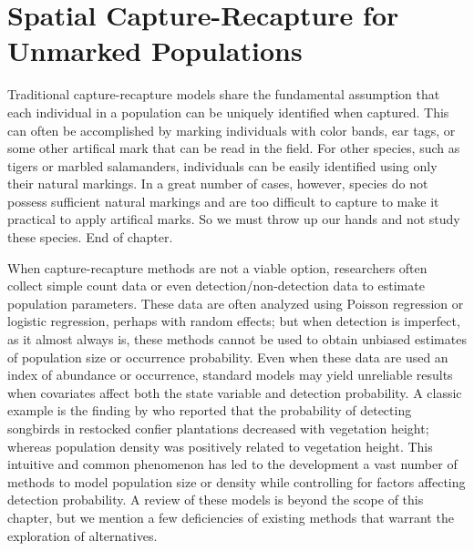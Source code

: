 


\chapter{Spatial Capture-Recapture for Unmarked Populations}
\label{chapt.scr-unmarked}

\vspace{0.3cm}


Traditional capture-recapture models share the fundamental
assumption that each individual in a population can be uniquely
identified when captured. This can often be accomplished
by marking individuals with color bands, ear tags, or some other
artifical mark that can be read in the field. For other species, such as
tigers or marbled salamanders, individuals can be easily identified
using only their natural markings. In a great number of cases, however,
species do not possess sufficient natural markings and are too
difficult to capture to make it practical to apply artifical marks. So
we must throw up our hands and not study these species. End of
chapter.

When capture-recapture methods are not a viable option, researchers
often collect simple count data or even detection/non-detection data
to estimate population parameters. These data are often analyzed using
Poisson regression or logistic regression, perhaps with random
effects; but when detection is imperfect, as it almost always is,
these methods cannot be used to obtain unbiased estimates of
population size or occurrence probability. Even when these data are
used an index of abundance or occurrence, standard models may yield
unreliable results when covariates affect both the state variable and
detection probability. A classic example is the finding by
\citet{bibby_buckland:1987} who reported that the probability of detecting
songbirds in restocked confier plantations decreased with vegetation
height; whereas population density was positively related to
vegetation height. This intuitive and common phenomenon has led to the
development a vast number of methods to model population size or
density while controlling for factors affecting detection
probability. A review of these models is beyond the scope of this
chapter, but we mention a few deficiencies of existing methods
that warrant the exploration of alternatives.

